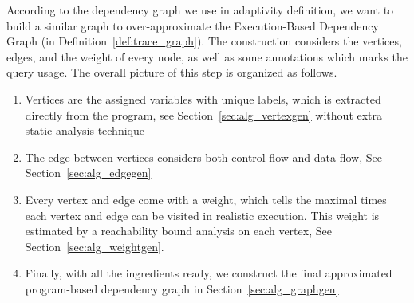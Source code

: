 According to the dependency graph we use in adaptivity definition, we want to build a similar graph to {over-}approximate the
Execution-Based Dependency Graph (in Definition~\ref{def:trace_graph}). The construction considers the vertices, edges, and the weight of every node, as well as some annotations which marks the query usage. The overall picture of this step is organized as follows.


\begin{enumerate}
\item  Vertices are the assigned variables with unique labels, which is extracted directly from the program, see Section~\ref{sec:alg_vertexgen}
without extra static analysis technique
\item The edge between vertices considers both control flow and data flow, See
Section~\ref{sec:alg_edgegen}
\item Every vertex and edge come with a weight, which tells the maximal times each vertex and edge can be visited in realistic execution. This weight is estimated by a reachability bound analysis on each vertex, See Section~\ref{sec:alg_weightgen}.
\item  Finally, with all the ingredients ready, we construct the final approximated program-based dependency graph in Section~\ref{sec:alg_graphgen}
\end{enumerate}

